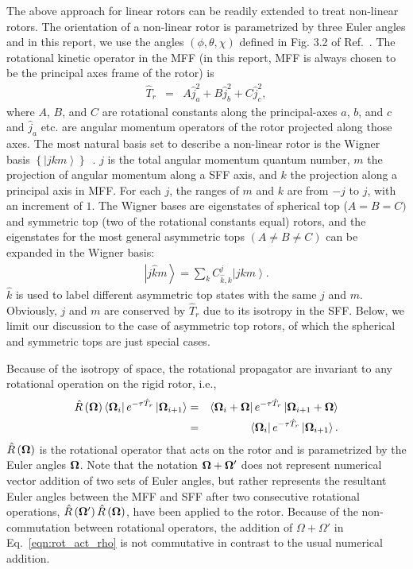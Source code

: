 \documentclass[12pt]{iopart}
\begin{document}
The above approach  for linear rotors can be readily extended to treat non-linear rotors. 
The orientation of a non-linear rotor is parametrized by three Euler angles and in this report, 
we use the angles $\left(\phi,\theta,\chi \right)$ defined in Fig. 3.2 of Ref.~\cite{zare_1988}. 
The rotational kinetic operator in the MFF (in this report, MFF is always chosen to be the principal axes frame of the rotor) is
\begin{eqnarray}
\hat{T}_r&=&A\hat{j}_a^2+B\hat{j}_b^2+C\hat{j}_c^2, \label{eqn:asym_tr}
\end{eqnarray}
where $A$, $B$, and $C$ are rotational constants along the principal-axes $a$, $b$, and $c$ and $\hat{j}_a$ etc. are angular momentum operators of the rotor projected along those axes. 
The most natural basis set to describe a non-linear rotor is the Wigner basis $\left\{\left|jkm \right>\right\}$~\cite{bunker_jensen_book}. $j$ is the total angular momentum quantum number, $m$ the projection of angular momentum along a SFF axis, and $k$ the projection along a principal axis in MFF. 
For each $j$, the ranges of $m$ and $k$ are from $-j$ to $j$, with an increment of $1$. 
The Wigner bases are eigenstates of spherical top ($A=B=C)$ and symmetric top (two of the rotational constants equal) rotors, and the eigenstates for the most general asymmetric tops $(A\ne B\ne C)$ can be expanded in the Wigner basis:
\begin{eqnarray}
\left|j\hat{k}m \right>=\sum_k C_{\hat{k},k}^{j}\left|jkm \right>.
\end{eqnarray}
$\hat{k}$ is used to label different asymmetric top states with the same $j$ and $m$. Obviously, $j$ and $m$ are conserved by $\hat{T}_{r}$ due to its isotropy in the SFF.  
Below, we limit our discussion to the case of asymmetric top rotors, of which the spherical and symmetric tops are just special cases.

Because of the isotropy of  space, the rotational propagator are invariant to any rotational operation on the rigid rotor, i.e.,
\begin{eqnarray}
\hat{R}\left( {\bf \Omega} \right)\left<{\bf \Omega}_i\right| e^{ -\tau\hat{T}_r }\left| {\bf \Omega}_{i+1} \right>&=&\left<{\bf \Omega}_i+{\bf \Omega}\right| e^{ -\tau\hat{T}_r }\left| {\bf \Omega}_{i+1} +{\bf \Omega}\right>\nonumber\\
&=&\left<{\bf \Omega}_i\right| e^{ -\tau\hat{T}_r }\left| {\bf \Omega}_{i+1} \right>. \label{eqn:rot_act_rho}
\end{eqnarray}
$\hat{R}\left({\bf  \Omega} \right)$ is the rotational operator that acts on the rotor and is parametrized by the Euler angles ${\bf \Omega}$. Note that the notation 
${\bf \Omega} +{\bf \Omega}' \label{eqn:ang_sum}$ does not represent numerical vector addition of two sets of Euler angles, but rather represents the resultant Euler angles between the MFF and SFF after two consecutive rotational operations, $\hat{R}\left({\bf \Omega}' \right)\hat{R}\left({\bf \Omega} \right)$, have been applied to the rotor. 
Because of the non-commutation between rotational operators, the addition of $\Omega+\Omega'$ in Eq.~\ref{eqn:rot_act_rho} is not commutative in contrast to  the usual numerical addition.
\end{document}
